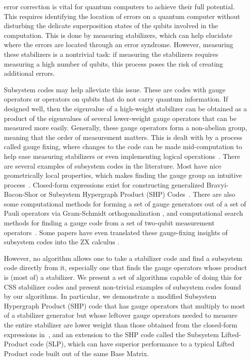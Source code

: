 \documentclass[conference]{IEEEtran}
\begin{document}
 error correction is vital for quantum computers to achieve their full potential. 
This requires identifying the location of errors on a quantum computer without disturbing the delicate superposition states of the qubits involved in the computation. 
This is done by measuring stabilizers, which can help elucidate where the errors are located through an error syndrome. 
However, measuring these stabilizers is a nontrivial task: if measuring the stabilizers requires measuring a high number of qubits, this process poses the risk of creating additional errors.

Subsystem codes may help alleviate this issue. 
These are codes with gauge operators or operators on qubits that do not carry quantum information. %
If designed well, then the eigenvalue of a high-weight stabilizer can be obtained as a product of the eigenvalues of several lower-weight gauge operators that can be measured more easily.
Generally, these gauge operators form a non-abelian group, meaning that the order of measurement matters. 
This is dealt with by a process called gauge fixing, where changes to the code can be made mid-computation to help ease measuring stabilizers or even implementing logical operations~\cite{nbreuckmann}. 
There are several examples of subsystem codes in the literature. 
Most have nice geometrically local properties, which makes finding the gauge group an intuitive process~\cite{higgott2021subsystem}. 
Closed-form expressions exist for constructing generalized Bravyi-Bacon-Shor or Subsystem Hypergraph Product (SHP) Codes~\cite{li2020numerical}. 
There are also some computational methods for forming a set of gauge generators out of a set of Pauli operators via Gram-Schmidt orthogonalization \cite{wilde2009logical}, and computational search methods for finding a gauge code from a set of two-qubit measurement operators~\cite{crosswhite2011automated}. 
Some papers have even translated these gauge-fixing insights of subsystem codes into the ZX calculus \cite{huang2023graphical}.  

However, no algorithm allows one to take a stabilizer code and find a subsystem code directly from it, especially one that finds the gauge operators whose product is (most of) a stabilizer. 
We present a set of algorithms capable of doing this for CSS stabilizer codes and present non-trivial examples of subsystem codes found by our algorithms. 
In particular, we demonstrate a modified Subsystem Hypergraph Product (SHP) code that has gauge operators that multiply to most of a stabilizer generator but whose leftover gauge operators needed to measure the entire stabilizer are lower weight than those obtained from the closed-form expressions in~\cite{li2020numerical}, and an extension to the SHP code called the Subsystem Lifted-Product code (SLP), which can have superior performance to a typical Lifted Product code built out of the same Base Matrix.
\end{document}
